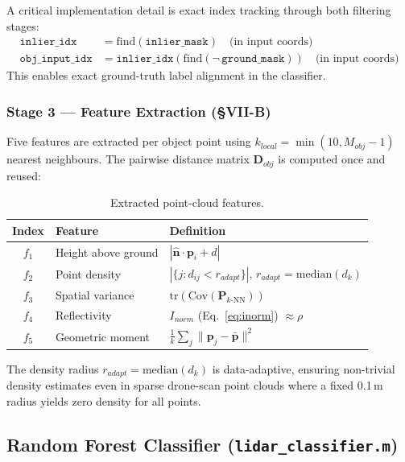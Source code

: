 \documentclass[12pt,a4paper]{article}
\begin{document}
A critical implementation detail is exact index tracking through both filtering
stages:
\begin{align}
    \texttt{inlier\_idx} &= \mathrm{find}(\texttt{inlier\_mask})
    \quad\text{(in input coords)} \\
    \texttt{obj\_input\_idx} &= \texttt{inlier\_idx}(\mathrm{find}(\lnot\,\texttt{ground\_mask}))
    \quad\text{(in input coords)}
\end{align}
This enables exact ground-truth label alignment in the classifier.

\subsubsection{Stage 3 --- Feature Extraction (\S VII-B)}
Five features are extracted per object point using $k_{local} = \min(10, M_{obj}-1)$
nearest neighbours.  The pairwise distance matrix $\mathbf{D}_{obj}$ is computed once
and reused:

\begin{table}[H]
\centering
\caption{Extracted point-cloud features.}
\label{tab:features}
\begin{tabular}{cll}
\toprule
\textbf{Index} & \textbf{Feature} & \textbf{Definition} \\
\midrule
$f_1$ & Height above ground & $|\hat{\mathbf{n}}\cdot\mathbf{p}_i + d|$ \\
$f_2$ & Point density       & $|\{j : d_{ij} < r_{adapt}\}|$, $r_{adapt}=\mathrm{median}(d_k)$ \\
$f_3$ & Spatial variance    & $\mathrm{tr}(\mathrm{Cov}(\mathbf{P}_{k\text{-NN}}))$ \\
$f_4$ & Reflectivity        & $I_{norm}$ (Eq.~\ref{eq:inorm}) $\approx \rho$ \\
$f_5$ & Geometric moment    & $\frac{1}{k}\sum_{j}\|\mathbf{p}_j - \bar{\mathbf{p}}\|^2$ \\
\bottomrule
\end{tabular}
\end{table}

The density radius $r_{adapt} = \mathrm{median}(d_k)$ is data-adaptive, ensuring
non-trivial density estimates even in sparse drone-scan point clouds where a fixed
0.1\,m radius yields zero density for all points.

\subsection{Random Forest Classifier (\texttt{lidar\_classifier.m})}
\end{document}
